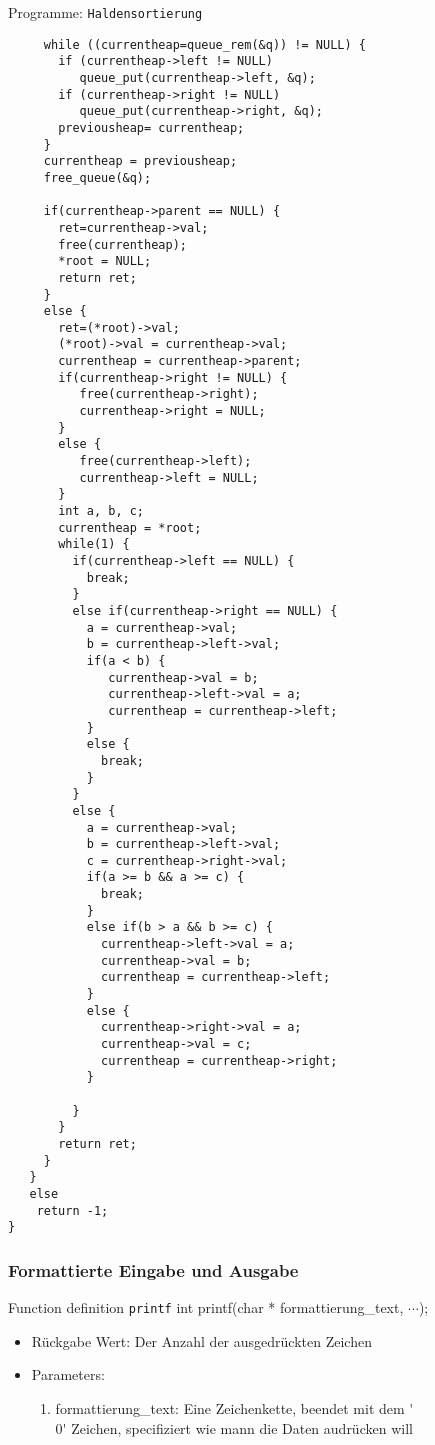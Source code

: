 \begin{myexampleprogram}{Programme: \texttt{Haldensortierung}}
\begin{lstlisting}
     while ((currentheap=queue_rem(&q)) != NULL) {
       if (currentheap->left != NULL)
          queue_put(currentheap->left, &q);
       if (currentheap->right != NULL)
          queue_put(currentheap->right, &q);
       previousheap= currentheap;
     }
     currentheap = previousheap;
     free_queue(&q);

     if(currentheap->parent == NULL) {
       ret=currentheap->val;
       free(currentheap);
       *root = NULL;
       return ret;
     }
     else {
       ret=(*root)->val;
       (*root)->val = currentheap->val;
       currentheap = currentheap->parent;
       if(currentheap->right != NULL) {
          free(currentheap->right);
          currentheap->right = NULL;
       }
       else {
          free(currentheap->left);
          currentheap->left = NULL;
       }
       int a, b, c;
       currentheap = *root;
       while(1) {
         if(currentheap->left == NULL) {
           break;
         }
         else if(currentheap->right == NULL) {
           a = currentheap->val;
           b = currentheap->left->val;
           if(a < b) {
              currentheap->val = b;
              currentheap->left->val = a;
              currentheap = currentheap->left;
           }
           else {
             break;
           }
         }
         else {
           a = currentheap->val;
           b = currentheap->left->val;
           c = currentheap->right->val;
           if(a >= b && a >= c) {
             break;
           }
           else if(b > a && b >= c) {
             currentheap->left->val = a;
             currentheap->val = b;
             currentheap = currentheap->left;
           }
           else {
             currentheap->right->val = a;
             currentheap->val = c;
             currentheap = currentheap->right;
           }

         }
       }
       return ret;
     }
   }
   else
    return -1;
}
\end{lstlisting}
\end{myexampleprogram}
\subsubsection{Formattierte Eingabe und Ausgabe}
\begin{myexampleblock}{Function definition \texttt{printf}}
int printf(char * formattierung\_text, $\cdots$);
\begin{itemize}
\item Rückgabe Wert: Der Anzahl der ausgedrückten Zeichen
\item Parameters:
\begin{enumerate}
\item formattierung\_text: Eine Zeichenkette, beendet mit dem \'{}\\0\'{} Zeichen, specifiziert wie mann die Daten
audrücken will
\end{enumerate}
\end{itemize}
\end{myexampleblock}
\pagebreak
